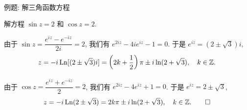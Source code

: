 \begin{frame}{例题: 解三角函数方程}
\begin{example}
解方程 $\sin z=2$ 和 $\cos z=2$.
\end{example}
\begin{solution}
\indent
由于 $\sin z=\dfrac{e^{iz}-e^{-iz}}{2i}=2$,
\onslide<+->
我们有 $e^{2iz}-4ie^{iz}-1=0$.
\onslide<+->
于是 $e^{iz}=(2\pm\sqrt 3)i$,
\onslide<+->
\vspace{-4pt}
\[z=-i\operatorname{Ln}[(2\pm\sqrt 3)i]=\left(2k+\frac12\right)\pi\pm i\ln(2+\sqrt3),\quad k\in{\mathbb{Z}}.\]
\vspace{-14pt}

\indent
\onslide<+->
由于 $\cos z=\dfrac{e^{iz}+e^{-iz}}2=2$,
\onslide<+->
我们有 $e^{2iz}-4e^{iz}+1=0$.
\onslide<+->
于是 $e^{iz}=2\pm\sqrt 3$,
\onslide<+->
\vspace{-4pt}
\[z=-i\operatorname{Ln}(2\pm\sqrt 3)=2k\pi\pm i\ln(2+\sqrt3),\quad k\in{\mathbb{Z}}.\qedhere\]
\vspace{-14pt}
\end{solution}
\end{frame}

